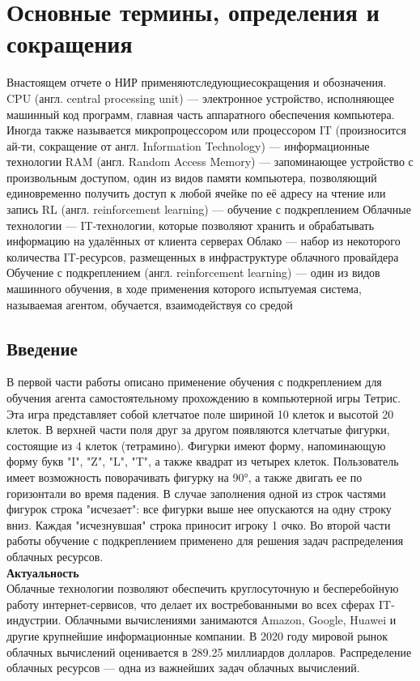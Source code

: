 \documentclass{article}
\begin{document}
\section {Основные термины, определения и сокращения}
Внастоящем отчете о НИР применяютследующиесокращения и обозначения.
\bigskip
CPU (англ. central processing unit) — электронное устройство, исполняющее машинный код программ, главная часть аппаратного обеспечения компьютера. Иногда также называется микропроцессором или процессором
\bigskip
IT (произносится ай-ти, сокращение от англ. Information Technology) — информационные технологии
\bigskip
RAM (англ. Random Access Memory) — запоминающее устройство с произвольным доступом, один из видов памяти компьютера, позволяющий единовременно получить доступ к любой ячейке по её адресу на чтение или запись
\bigskip
RL (англ. reinforcement learning) — обучение с подкреплением
\bigskip
Облачные технологии — IT-технологии, которые позволяют хранить и обрабатывать информацию на удалённых от клиента серверах
\bigskip
Облако — набор из некоторого количества IT-ресурсов, размещенных в инфраструктуре облачного провайдера
\bigskip
Обучение с подкреплением (англ. reinforcement learning) — один из видов машинного обучения, в ходе применения которого испытуемая система, называемая агентом, обучается, взаимодействуя со средой
\bigskip
\newpage
\begin{center}
\section {Введение}
\end{center}
В первой части работы описано применение обучения с подкреплением для обучения агента самостоятельному прохождению в компьютерной игры Тетрис\cite{litlink1}. Эта игра представляет собой клетчатое поле шириной 10 клеток и высотой 20 клеток. В верхней части поля друг за другом появляются клетчатые фигурки, состоящие из 4 клеток (тетрамино). Фигурки имеют форму, напоминающую форму букв "I", "Z", "L", "T", а также квадрат из четырех клеток. Пользователь имеет возможность поворачивать фигурку на 90°, а также двигать ее по горизонтали во время падения. В случае заполнения одной из строк частями фигурок строка "исчезает": все фигурки выше нее опускаются на одну строку вниз. Каждая "исчезнувшая" строка приносит игроку 1 очко.
Во второй части работы обучение с подкреплением применено для решения задач распределения облачных ресурсов.\\
\textbf{Актуальность}\\
Облачные технологии позволяют обеспечить круглосуточную и бесперебойную работу интернет-сервисов, что делает их востребованными во всех сферах IT-индустрии. Облачными вычислениями занимаются Amazon, Google, Huawei и другие крупнейшие информационные компании\cite{litlink2}\cite{litlink3}. В 2020 году мировой рынок облачных вычислений оценивается в 289.25 миллиардов долларов\cite{litlink4}. Распределение облачных ресурсов — одна из важнейших задач облачных вычислений.\\
\end{document}
